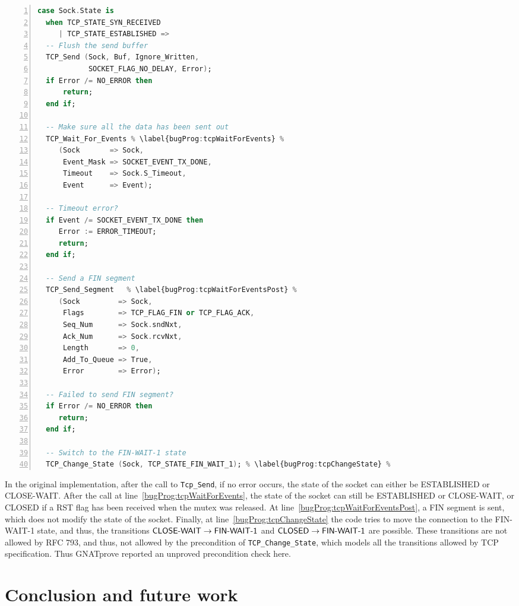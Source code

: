 \documentclass[conference]{IEEEtran}
\def\spark#1{\lstinline[language=Ada]{#1}}
\def\state#1{\textsf{\MakeUppercase{#1}}\xspace}
\def\sclosed{\state{closed}}
\def\sestab{\state{established}}
\def\sfwone{\state{fin-wait-1}}
\def\sclosew{\state{close-wait}}
\def\flag#1{\textsf{#1}\xspace}
\def\rst{\flag{RST}}
\def\fin{\flag{FIN}}
\begin{document}
\begin{lstlisting}[language=Ada, basicstyle=\footnotesize\ttfamily,
                    numbers=left, numberstyle=\tiny, escapechar=\%,
                    numbersep=0pt]
case Sock.State is
  when TCP_STATE_SYN_RECEIVED
     | TCP_STATE_ESTABLISHED =>
  -- Flush the send buffer
  TCP_Send (Sock, Buf, Ignore_Written,
            SOCKET_FLAG_NO_DELAY, Error);
  if Error /= NO_ERROR then
      return;
  end if;

  -- Make sure all the data has been sent out
  TCP_Wait_For_Events % \label{bugProg:tcpWaitForEvents} %
     (Sock       => Sock,
      Event_Mask => SOCKET_EVENT_TX_DONE,
      Timeout    => Sock.S_Timeout,
      Event      => Event);

  -- Timeout error?
  if Event /= SOCKET_EVENT_TX_DONE then
     Error := ERROR_TIMEOUT;
     return;
  end if;

  -- Send a FIN segment
  TCP_Send_Segment   % \label{bugProg:tcpWaitForEventsPost} %
     (Sock         => Sock,
      Flags        => TCP_FLAG_FIN or TCP_FLAG_ACK,
      Seq_Num      => Sock.sndNxt,
      Ack_Num      => Sock.rcvNxt,
      Length       => 0,
      Add_To_Queue => True,
      Error        => Error);

  -- Failed to send FIN segment?
  if Error /= NO_ERROR then
     return;
  end if;

  -- Switch to the FIN-WAIT-1 state
  TCP_Change_State (Sock, TCP_STATE_FIN_WAIT_1); % \label{bugProg:tcpChangeState} %
\end{lstlisting}

In the original implementation, after the call to \spark{Tcp_Send}, if no error occurs, the state of the socket can either be \sestab or \sclosew. After the call at line~\ref{bugProg:tcpWaitForEvents}, the state of the socket can still be \sestab or \sclosew, or \sclosed if a \rst flag has been received when the mutex was released. At line~\ref{bugProg:tcpWaitForEventsPost}, a \fin segment is sent, which does not modify the state of the socket. Finally, at line~\ref{bugProg:tcpChangeState} the code tries to move the connection to the \sfwone state, and thus, the transitions $\text{\sclosew} \rightarrow \text{\sfwone}$ and $\text{\sclosed} \rightarrow \text{\sfwone}$ are possible.
These transitions are not allowed by RFC 793, and thus, not allowed by the precondition of \spark{TCP_Change_State}, which models all the transitions allowed by TCP specification. Thus GNATprove reported an unproved precondition check here.

\section{Conclusion and future work}
\end{document}
